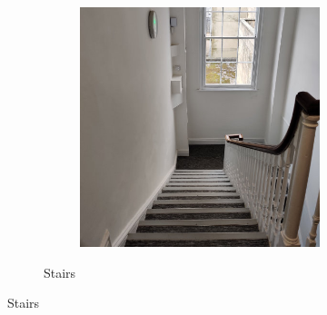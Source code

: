 \begin{figure}[!hbtp]
\begin{subfigure}[b]{\textwidth}
\begin{subfigure}[b]{0.32\textwidth}
        \end{subfigure}
        \hfill
        \begin{subfigure}[b]{0.32\textwidth}
             \centering
             \includegraphics[width=\textwidth]{content/3-Methods/enviroments/stair_3_modified.jpg}
        \end{subfigure}
        \caption{Stairs}
        \label{fig:methods-stair-example}
      \end{subfigure}
      \newline
      

\end{figure}
